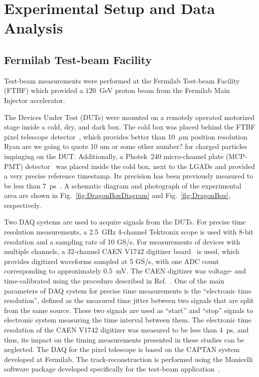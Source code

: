 \documentclass[preprint,1p]{elsarticle}
\begin{document}
\section{Experimental Setup and Data Analysis} 
\label{sec:setup}
\subsection{Fermilab Test-beam Facility}
Test-beam measurements were performed at the Fermilab Test-beam Facility (FTBF)
which provided a $120$~GeV proton beam from the Fermilab Main Injector
accelerator. 

The Devices Under Test (DUTs) were mounted on a remotely operated
motorized stage inside a cold, dry, and dark box. The cold box was placed behind the FTBF pixel telescope detector~\cite{KWAN2016162}, which provides better than 10~$\mu$m position resolution {\color{red} Ryan are we going to quote 10 um or some other number?} for charged
particles impinging on the DUT. Additionally, a Photek~240 micro-channel plate
(MCP-PMT) detector~\cite{Anderson:2015gha, MCPFastCaloNIMA,
Ronzhin2015288,Ronzhin201552} was placed inside the cold box, next to the LGADs and provided a very precise reference timestamp. Its precision has been previously 
measured to be less than $7$~ps~\cite{Ronzhin2015288}. A schematic diagram and
photograph of the experimental area are shown in Fig.~\ref{fig:DragonBoxDiagram}
and Fig.~\ref{fig:DragonBox}, respectively. 

Two DAQ systems are used to acquire signals from the DUTs. For precise time resolution measurements, a \SI{2.5}{\giga\Hz} 4-channel Tektronix scope is used with 8-bit resolution and a sampling rate of 10 GS/s.
For measurements of devices with multiple channels, a 32-channel CAEN V1742 digitizer board~\cite{CAENDRS} is used, which provides digitized waveforms sampled at 5 GS/s, with one ADC count corresponding to approximately 0.5~mV. The CAEN digitizer was
voltage- and time-calibrated using the procedure described in
Ref.~\cite{Kim201467}. One of the main parameters of DAQ system for precise time
measurements is the ``electronic time resolution'', defined as the measured time
jitter between two signals that are split from the same source. These two
signals are used as ``start'' and ``stop'' signals to electronic system
measuring the time interval between them. The electronic time resolution of the
CAEN V1742 digitizer was measured to be less than 4~ps, and thus, its impact on
the timing measurements presented in these studies can be neglected. The DAQ for
the pixel telescope is based on the CAPTAN system developed at
Fermilab. The track-reconstruction is performed using the
Monicelli software package developed specifically for the test-beam application~\cite{KWAN2016162}. 
\end{document}
